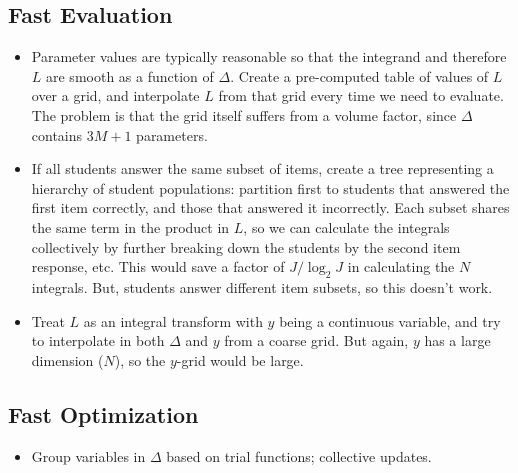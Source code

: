 \documentclass{article}
\begin{document}
\subsection{Fast Evaluation}
\begin{itemize}
\item Parameter values are typically reasonable so that the integrand and therefore $L$ are smooth as a function of $\Delta$. Create a pre-computed table of values of $L$ over a grid, and interpolate $L$ from that grid every time we need to evaluate. The problem is that the grid itself suffers from a volume factor, since $\Delta$ contains $3M+1$ parameters.

\item If all students answer the same subset of items, create a tree representing a hierarchy of student populations: partition first to students that answered the first item correctly, and those that answered it incorrectly. Each subset shares the same term in the product in $L$, so we can calculate the integrals collectively by further breaking down the students by the second item response, etc. This would save a factor of $J / \log_2 J$ in calculating the $N$ integrals. But, students answer different item subsets, so this doesn't work.

\item Treat $L$ as an integral transform with $y$ being a continuous variable, and try to interpolate in both $\Delta$ and $y$ from a coarse grid. But again, $y$ has a large dimension ($N$), so the $y$-grid would be large.

\end{itemize}

\subsection{Fast Optimization}
\begin{itemize}
\item Group variables in $\Delta$ based on trial functions; collective updates.
\end{itemize}
\end{document}
